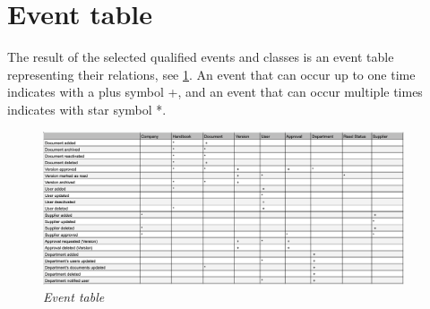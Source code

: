 \section{Event table}
The result of the selected qualified events and classes is an event table representing their relations, see \cref{fig:eventtable}. An event that can occur up to one time indicates with a plus symbol +, and an event that can occur multiple times indicates with star symbol *.

\begin{figure}[H]
	\centering
	\includegraphics[width=0.95\textwidth]{billeder/Event_table.png}
	\caption{\textit{Event table
	}\label{fig:eventtable}}
\end{figure}


